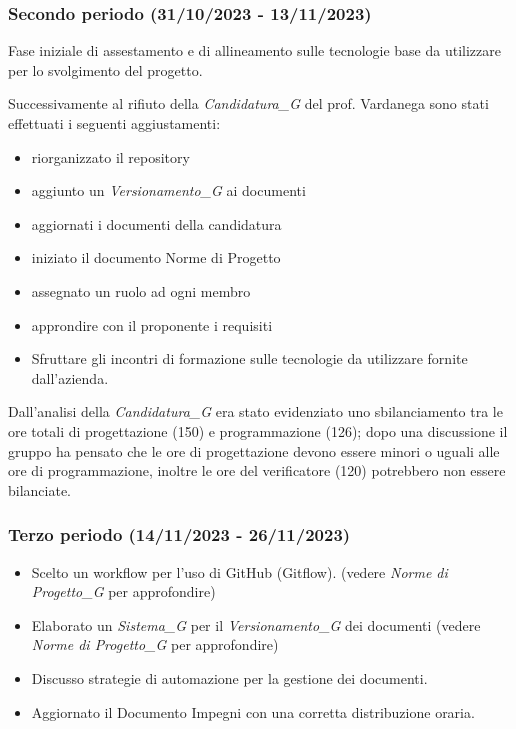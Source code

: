 \subsubsection{Secondo periodo (31/10/2023 - 13/11/2023)}
Fase iniziale di assestamento e di allineamento sulle tecnologie base da utilizzare per lo svolgimento del progetto.

Successivamente al rifiuto della \textit{Candidatura_G} del prof. Vardanega sono stati effettuati i seguenti aggiustamenti:
\begin{itemize}
    \item riorganizzato il repository
    \item aggiunto un \textit{Versionamento_G} ai documenti
    \item aggiornati i documenti della candidatura
    \item iniziato il documento Norme di Progetto
    \item assegnato un ruolo ad ogni membro
\end{itemize}

\begin{itemize}
    \item approndire con il proponente i requisiti
    \item Sfruttare gli incontri di formazione sulle tecnologie da utilizzare fornite
dall’azienda.
\end{itemize}

Dall'analisi della \textit{Candidatura_G} era stato evidenziato uno sbilanciamento tra le ore totali di progettazione (150)
e programmazione (126); dopo una discussione il gruppo ha pensato che le ore di
progettazione devono essere minori o uguali alle ore di programmazione, inoltre le
ore del verificatore (120) potrebbero non essere bilanciate.


\subsubsection{Terzo periodo (14/11/2023 - 26/11/2023)}

\begin{itemize}
    \item Scelto un workflow per l'uso di GitHub (Gitflow). (vedere \textit{Norme di Progetto_G} per approfondire)
    \item Elaborato un \textit{Sistema_G} per il \textit{Versionamento_G} dei documenti (vedere \textit{Norme di Progetto_G} per approfondire)
    \item Discusso strategie di automazione per la gestione dei documenti.
    \item Aggiornato il Documento Impegni con una corretta distribuzione oraria.
\end{itemize}

